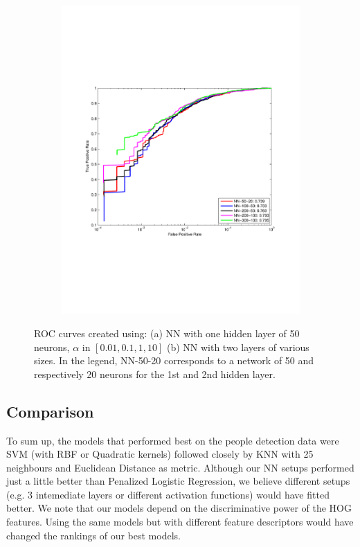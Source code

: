\begin{figure}[h]
\begin{subfigure}[b]{0.49\textwidth}
    \includegraphics[width=\textwidth]{figures/NN-2layers.pdf}
    \caption{}
    \label{fig:NNb}
  \end{subfigure}
  \caption{ROC curves created using: (a) NN with one hidden layer of 50 neurons, $\alpha$ in $[0.01,0.1,1,10]$ (b) NN with two layers of various sizes. In the legend, NN-50-20 corresponds to a network of 50 and respectively 20  neurons for the 1st and 2nd hidden layer.}
\end{figure}

\subsection{Comparison}
To sum up, the models that performed best on the people detection data were SVM (with RBF or Quadratic kernels) followed closely by KNN with 25 neighbours and Euclidean Distance as metric. Although our NN setups performed just a little better than Penalized Logistic Regression, we believe different setups (e.g. 3 intemediate layers or different activation functions) would have fitted better. 
We note that our models depend on the discriminative power of the HOG features. Using the same models but with different feature descriptors would have changed the rankings of our best models. 
